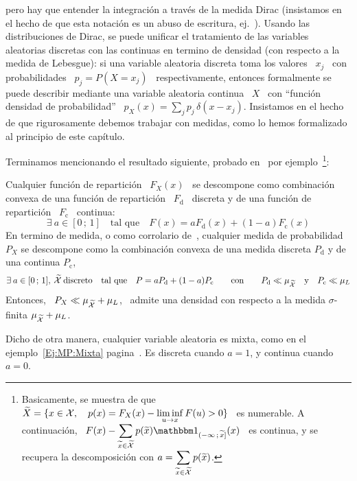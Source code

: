 %
pero hay que entender la integraci\'on a trav\'es de la medida Dirac (insistamos
en   el   hecho   de  que   esta   notaci\'on   es   un  abuso   de   escritura,
ej.~\cite{GelShi64}).  Usando las distribuciones  de Dirac, se puede unificar el
tratamiento de las  variables aleatorias discretas con las  continuas en termino
de densidad  (con respecto a  la medida de  Lebesgue): si una  variable aleatoria
discreta toma los  valores \ $x_j$ \ con  probabilidades \ $p_j = P(X  = x_j)$ \
respectivamente, entonces  formalmente se puede describir  mediante una variable
aleatoria continua \ $X$ \  con ``funci\'on densidad de probabilidad'' \ $p_X(x)
= \sum_j  p_j \,  \delta(x-x_j)$.  Insistamos en  el hecho de  que rigurosamente
debemos trabajar  con medidas,  como lo hemos  formalizado al principio  de este
cap\'itulo.

Terminamos mencionando el  resultado siguiente, probado en~\cite[Ec.~(2.5)~p.~47
\& teorema~4.1.1]{AthLah} por ejemplo~\footnote{Basicamente, se muestra de que \
  $\displaystyle \widetilde{X} =  \{ x \in \mathcal{X}, \quad p(x)  = F_X(x) - \liminf_{u
    \to x} F(u) > 0 \}$ \ es numerable.  A continuaci\'on, \ $\displaystyle F(x)
  - \sum_{\widetilde{x} \in  \widetilde{\X}} p(\widetilde{x}) \un_{(-\infty \, ;
    \, \widetilde{x}]}(x)$ \ es continua,  y se recupera la descomposici\'on con
  $\displaystyle     a     =     \sum_{\widetilde{x}     \in     \widetilde{\mathcal{X}}}
  p(\widetilde{x})$.}:
%
\begin{teorema}
\label{Teo:MP:DescompositionMixta}
%
  Cualquier  funci\'on  de  repartici\'on   \  $F_X(x)$  \  se  descompone  como
  combinaci\'on convexa  de una funci\'on de repartici\'on  \ $F_{\mathrm{d}}$ \
  discreta y de una funci\'on de repartici\'on \ $F_{\mathrm{c}}$ \ continua:
  \[
  \exists  \:  a \in  [0  \,  ;  \, 1]  \quad  \mbox{tal  que}  \quad F(x)  =  a
  F_{\mathrm{d}}(x) + (1-a) F_{\mathrm{c}}(x)
  \]
  En  termino  de  medida,  o como  corrolario  de~\cite[teorema~4.1.1]{AthLah},
  cualquier  medida de probabilidad  $P_X$ se  descompone como  la combinaci\'on
  convexa   de  una  medida   discreta  $P_{\mathrm{d}}$   y  de   una  continua
  $P_{\mathrm{c}}$,
  \[
  \exists \:  a \in [0  \, ; \,  1], \: \widetilde{\mathcal{X}} \:  \mbox{discreto} \quad
  \mbox{tal  que} \quad  P  =  a P_{\mathrm{d}}  +  (1-a) P_{\mathrm{c}}  \qquad
  \mbox{con} \qquad P_{\mathrm{d}} \ll \mu_{\widetilde{\mathcal{X}}} \quad \mbox{y} \quad
  P_{\mathrm{c}} \ll \mu_L
  \]
  Entonces, \ $P_X \ll \mu_{\widetilde{\mathcal{X}}}  + \mu_L$, \ \ie admite una densidad
  con respecto a la medida $\sigma$-finita $\mu_{\widetilde{\mathcal{X}}} + \mu_L$.
\end{teorema}
%
Dicho  de  otra manera,  cualquier  variable aleatoria  es  mixta,  como en  el
ejemplo~\ref{Ej:MP:Mixta} pagina~\pageref{Ej:MP:Mixta}. Es  discreta cuando $a =
1$, y continua cuando $a = 0$.



